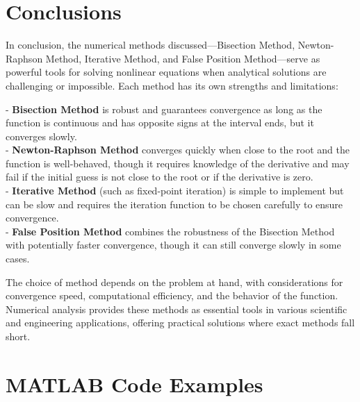\documentclass[12pt,a4paper]{article}
\begin{document}
	
	
	
	
	
	
	
	
	\newpage
	\section{ Conclusions}
	
	In conclusion, the numerical methods discussed—Bisection Method, Newton-Raphson Method, Iterative Method, and False Position Method—serve as powerful tools for solving nonlinear equations when analytical solutions are challenging or impossible. Each method has its own strengths and limitations:
	
	- \textbf{Bisection Method} is robust and guarantees convergence as long as the function is continuous and has opposite signs at the interval ends, but it converges slowly. \\
	- \textbf{Newton-Raphson Method} converges quickly when close to the root and the function is well-behaved, though it requires knowledge of the derivative and may fail if the initial guess is not close to the root or if the derivative is zero. \\
	- \textbf{Iterative Method} (such as fixed-point iteration) is simple to implement but can be slow and requires the iteration function to be chosen carefully to ensure convergence. \\
	- \textbf{False Position Method} combines the robustness of the Bisection Method with potentially faster convergence, though it can still converge slowly in some cases.
	
	The choice of method depends on the problem at hand, with considerations for convergence speed, computational efficiency, and the behavior of the function. Numerical analysis provides these methods as essential tools in various scientific and engineering applications, offering practical solutions where exact methods fall short.
	
	
	\newpage
	
\appendix
\section{MATLAB Code Examples}
\lstset{ 
	basicstyle=\ttfamily,  
	breaklines=true,       
	frame=single,          
	numbers=left,          
	showstringspaces=false, 
	xleftmargin=0pt,       %
	framexleftmargin=0pt   %
}
\end{document}
